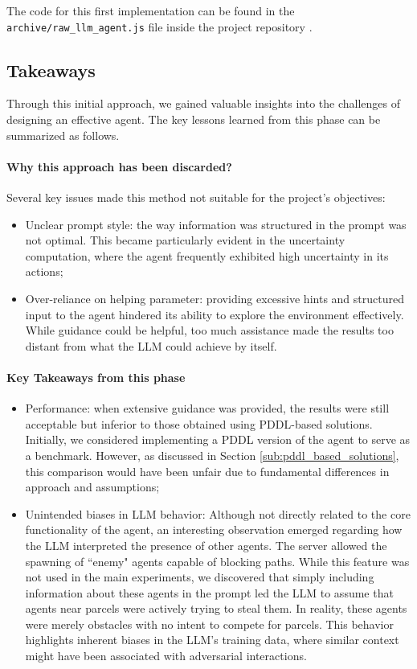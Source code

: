 The code for this first implementation can be found in the \texttt{archive/raw\_llm\_agent.js}
file inside the project repository \cite{projectrepo}.

\subsection{Takeaways}
Through this initial approach, we gained valuable insights into the challenges
of designing an effective agent. The key lessons learned from this phase can be summarized
as follows.

\paragraph{Why this approach has been discarded?}
Several key issues made this method not suitable for the project's objectives:
\begin{itemize}
  \item Unclear prompt style: the way information was structured in the prompt
    was not optimal. This became particularly evident in the uncertainty computation,
    where the agent frequently exhibited high uncertainty in its actions;

  \item Over-reliance on helping parameter: providing excessive hints and
    structured input to the agent hindered its ability to explore the
    environment effectively. While guidance could be helpful, too much
    assistance made the results too distant from what the LLM could achieve by
    itself.
\end{itemize}

\paragraph{Key Takeaways from this phase}
\begin{itemize}
  \item Performance: when extensive guidance was provided, the results were still
    acceptable but inferior to those obtained using PDDL-based solutions.
    Initially, we considered implementing a PDDL version of the agent to serve as
    a benchmark. However, as discussed in Section \ref{sub:pddl_based_solutions},
    this comparison would have been unfair due to fundamental differences in
    approach and assumptions;

  \item Unintended biases in LLM behavior: Although not directly related to the
    core functionality of the agent, an interesting observation emerged regarding
    how the LLM interpreted the presence of other agents. The server allowed the
    spawning of ``enemy" agents capable of blocking paths. While this feature
    was not used in the main experiments, we discovered that simply including information
    about these agents in the prompt led the LLM to assume that agents near parcels
    were actively trying to steal them. In reality, these agents were merely obstacles
    with no intent to compete for parcels. This behavior highlights inherent
    biases in the LLM's training data, where similar context might have been associated
    with adversarial interactions.
\end{itemize}

